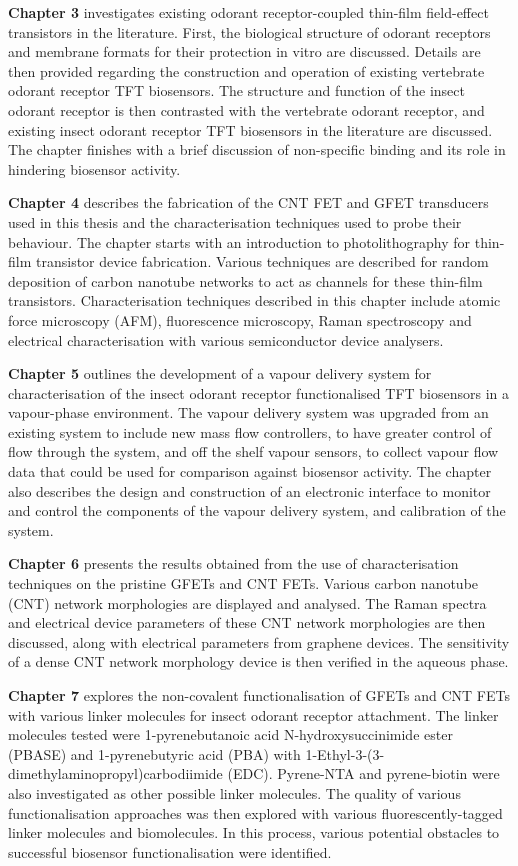 \documentclass[
  a4paper,
]{scrbook}
\begin{document}
\textbf{Chapter 3} investigates existing odorant receptor-coupled
thin-film field-effect transistors in the literature. First, the
biological structure of odorant receptors and membrane formats for their
protection in vitro are discussed. Details are then provided regarding
the construction and operation of existing vertebrate odorant receptor
TFT biosensors. The structure and function of the insect odorant
receptor is then contrasted with the vertebrate odorant receptor, and
existing insect odorant receptor TFT biosensors in the literature are
discussed. The chapter finishes with a brief discussion of non-specific
binding and its role in hindering biosensor activity.

\textbf{Chapter 4} describes the fabrication of the CNT FET and GFET
transducers used in this thesis and the characterisation techniques used
to probe their behaviour. The chapter starts with an introduction to
photolithography for thin-film transistor device fabrication. Various
techniques are described for random deposition of carbon nanotube
networks to act as channels for these thin-film transistors.
Characterisation techniques described in this chapter include atomic
force microscopy (AFM), fluorescence microscopy, Raman spectroscopy and
electrical characterisation with various semiconductor device analysers.

\textbf{Chapter 5} outlines the development of a vapour delivery system
for characterisation of the insect odorant receptor functionalised TFT
biosensors in a vapour-phase environment. The vapour delivery system was
upgraded from an existing system to include new mass flow controllers,
to have greater control of flow through the system, and off the shelf
vapour sensors, to collect vapour flow data that could be used for
comparison against biosensor activity. The chapter also describes the
design and construction of an electronic interface to monitor and
control the components of the vapour delivery system, and calibration of
the system.

\textbf{Chapter 6} presents the results obtained from the use of
characterisation techniques on the pristine GFETs and CNT FETs. Various
carbon nanotube (CNT) network morphologies are displayed and analysed.
The Raman spectra and electrical device parameters of these CNT network
morphologies are then discussed, along with electrical parameters from
graphene devices. The sensitivity of a dense CNT network morphology
device is then verified in the aqueous phase.

\textbf{Chapter 7} explores the non-covalent functionalisation of GFETs
and CNT FETs with various linker molecules for insect odorant receptor
attachment. The linker molecules tested were 1-pyrenebutanoic acid
N-hydroxysuccinimide ester (PBASE) and 1-pyrenebutyric acid (PBA) with
1-Ethyl-3-(3-dimethylaminopropyl)carbodiimide (EDC). Pyrene-NTA and
pyrene-biotin were also investigated as other possible linker molecules.
The quality of various functionalisation approaches was then explored
with various fluorescently-tagged linker molecules and biomolecules. In
this process, various potential obstacles to successful biosensor
functionalisation were identified.
\end{document}
